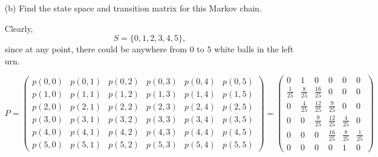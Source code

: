 \documentclass[11pt]{article}
\begin{document}
\begin{problem}
\begin{enumerate}
\begin{solution}
    \end{solution}
    \item[(b)] Find the state space and transition matrix for this Markov chain.
    \begin{solution}
        Clearly, \[\boxed{S = \{0,1,2,3,4,5\}},\] since at any point, there could be anywhere from $0$ to $5$ white balls in the left urn. 

        \[P = \begin{pmatrix}
            p(0,0) &p(0,1) & p(0,2) & p(0,3) & p(0,4) & p(0,5)\\
            p(1,0) & p(1,1) & p(1,2) & p(1,3) & p(1,4) & p(1,5)\\
            p(2,0) & p(2,1) & p(2,2) & p(2,3) & p(2,4) & p(2,5)\\
            p(3,0) & p(3,1) & p(3,2) & p(3,3) & p(3,4) & p(3,5)\\
            p(4,0) & p(4,1) & p(4,2) & p(4,3) & p(4,4) & p(4,5)\\
            p(5,0) & p(5,1) & p(5,2) & p(5,3) & p(5,4) & p(5,5)
        \end{pmatrix} = 
            \boxed{\begin{pmatrix}
            0 &1 & 0 & 0 & 0 & 0\\
            \frac{1}{25} & \frac{8}{25}& \frac{16}{25} & 0 & 0 & 0\\
            0 & \frac{4}{25}  & \frac{12}{25} & \frac{9}{25} & 0 & 0\\
            0 & 0 & \frac{9}{25} & \frac{12}{25} & \frac{4}{25} &0\\
            0 & 0 & 0 & \frac{16}{25} & \frac{8}{25} & \frac{1}{25}\\
            0 & 0 & 0 & 0 & 1 & 0
        \end{pmatrix}}\]
    \end{solution}
\end{enumerate}

\end{problem}

\newpage
\end{document}
